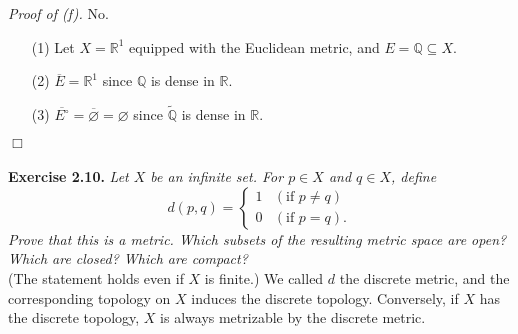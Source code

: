 \documentclass{article}
\begin{document}
\emph{Proof of (f).}
No.
\begin{enumerate}
\item[(1)]
Let $X = \mathbb{R}^1$ equipped with the Euclidean metric, and $E = \mathbb{Q} \subseteq X$.
\item[(2)]
$\overline{E} = \mathbb{R}^1$ since $\mathbb{Q}$ is dense in $\mathbb{R}$.
\item[(3)]
$\overline{E^\circ} = \overline{\varnothing} = \varnothing$
since $\widetilde{\mathbb{Q}}$ is dense in $\mathbb{R}$.
\end{enumerate}
$\Box$ \\\\






\textbf{Exercise 2.10.}
\emph{Let $X$ be an infinite set. For $p \in X$ and $q \in X$, define
\begin{equation*}
  d(p, q) =
    \begin{cases}
      1 & (\text{if } p \neq q) \\
      0 & (\text{if } p = q).
    \end{cases}
\end{equation*}
Prove that this is a metric.
Which subsets of the resulting metric space are open?
Which are closed?
Which are compact?} \\

(The statement holds even if $X$ is finite.)
We called $d$ the discrete metric,
and the corresponding topology on $X$ induces the discrete topology.
Conversely, if $X$ has the discrete topology, $X$ is always metrizable by the discrete metric. \\
\end{document}
